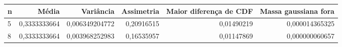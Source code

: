 \begin{tabular}{lrrrrr}
\toprule
n & Média & Variância & Assimetria & Maior diferença de CDF & Massa gaussiana fora \\
\midrule
5 & 0,3333333664 & 0,006349204772 & 0,20916515 & 0,01490219 & 0,000014365325 \\
8 & 0,3333333664 & 0,003968252983 & 0,16535957 & 0,01147869 & 0,000000060657 \\
\bottomrule
\end{tabular}
